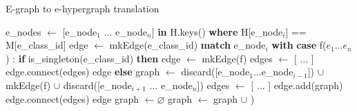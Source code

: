 \begin{algorithm}
    \caption{E-graph to e-hypergraph translation}
    \label{alg:translation}
    \begin{algorithmic}[1]
    \State e\_nodes $\gets$ [e\_node$_{1}$ $\ldots$ e\_node$_{n}$] \textbf{in} H.keys() \textbf{where} H[e\_node$_{i}$] == M[e\_class\_id]
    \State edge $\gets$ mkEdge(e\_class\_id)
    \State \textbf{match} e\_node$_{i}$ \textbf{with}
    \State \qquad \textbf{case} f($e_1 \ldots e_{n}$) :
    \State \qquad \qquad \textbf{if} is\_singleton(e\_class\_id) \textbf{then}
        \State \qquad\qquad \hspace{2em} edge $\gets$ mkEdge(f)
        \State \qquad \qquad \hspace{2em} edges $\gets$ [ $\ldots$ ]
        \State \qquad \qquad \hspace{2em} edge.connect(edges)
        \State \qquad \qquad \hspace{2em} \Return edge
    \State \qquad \qquad \textbf{else}
    \State \qquad \qquad \hspace{2em} graph $\gets$ discard([e\_node$_1$$\ldots$e\_node$_{i-1}$]) $\cup$ mkEdge(f) $\cup$ discard([e\_node$_{i+1}$ $\ldots$ e\_node$_{n}$])
        \State \qquad \qquad \hspace{2em} edges $\gets$ [ $\ldots$ ]
        \State \qquad \qquad \hspace{2em} edge.add(graph)
        \State \qquad \qquad \hspace{2em} edge.connect(edges)
    \EndFor
    \State \Return edge
    \EndFunction
    \State
    \State graph $\gets \varnothing$ 
    \State graph $\gets$ graph $\cup$ )

    \EndFor
    \end{algorithmic}
\end{algorithm}

